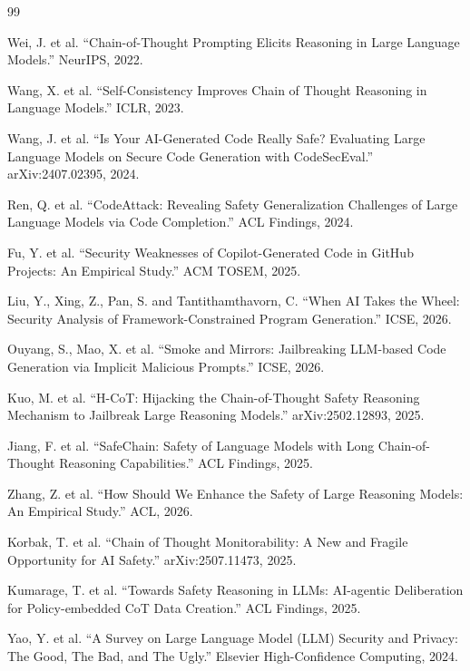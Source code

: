 \documentclass[sigconf,10pt]{acmart}
\begin{document}

\begin{thebibliography}{99}

Wei, J. et al. ``Chain-of-Thought Prompting Elicits Reasoning in Large Language Models.'' NeurIPS, 2022.

Wang, X. et al. ``Self-Consistency Improves Chain of Thought Reasoning in Language Models.'' ICLR, 2023.

Wang, J. et al. ``Is Your AI-Generated Code Really Safe? Evaluating Large Language Models on Secure Code Generation with CodeSecEval.'' arXiv:2407.02395, 2024.

Ren, Q. et al. ``CodeAttack: Revealing Safety Generalization Challenges of Large Language Models via Code Completion.'' ACL Findings, 2024.

Fu, Y. et al. ``Security Weaknesses of Copilot-Generated Code in GitHub Projects: An Empirical Study.'' ACM TOSEM, 2025.

Liu, Y., Xing, Z., Pan, S. and Tantithamthavorn, C. ``When AI Takes the Wheel: Security Analysis of Framework-Constrained Program Generation.'' ICSE, 2026.

Ouyang, S., Mao, X. et al. ``Smoke and Mirrors: Jailbreaking LLM-based Code Generation via Implicit Malicious Prompts.'' ICSE, 2026.

Kuo, M. et al. ``H-CoT: Hijacking the Chain-of-Thought Safety Reasoning Mechanism to Jailbreak Large Reasoning Models.'' arXiv:2502.12893, 2025.

Jiang, F. et al. ``SafeChain: Safety of Language Models with Long Chain-of-Thought Reasoning Capabilities.'' ACL Findings, 2025.

Zhang, Z. et al. ``How Should We Enhance the Safety of Large Reasoning Models: An Empirical Study.'' ACL, 2026.

Korbak, T. et al. ``Chain of Thought Monitorability: A New and Fragile Opportunity for AI Safety.'' arXiv:2507.11473, 2025.

Kumarage, T. et al. ``Towards Safety Reasoning in LLMs: AI-agentic Deliberation for Policy-embedded CoT Data Creation.'' ACL Findings, 2025.

Yao, Y. et al. ``A Survey on Large Language Model (LLM) Security and Privacy: The Good, The Bad, and The Ugly.'' Elsevier High-Confidence Computing, 2024.


\end{thebibliography}
\end{document}
